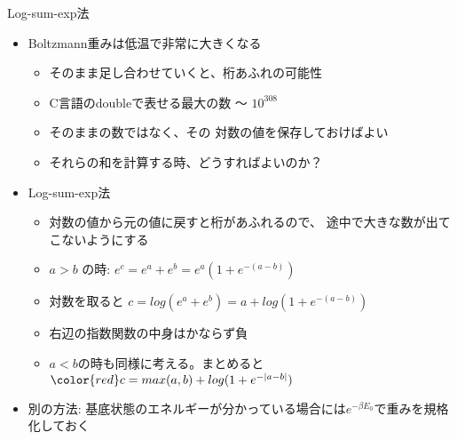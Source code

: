 
\begin{frame}[t,fragile]{Log-sum-exp法}
  \begin{itemize}
  \item Boltzmann重みは低温で非常に大きくなる
    \begin{itemize}
    \item そのまま足し合わせていくと、桁あふれの可能性
    \item C言語のdoubleで表せる最大の数 〜 $10^{308}$
    \item そのままの数ではなく、その{\color{red} 対数の値を保存}しておけばよい
    \item それらの和を計算する時、どうすればよいのか？
    \end{itemize}
  \item Log-sum-exp法
    \begin{itemize}
    \item 対数の値から元の値に戻すと桁があふれるので、{\color{red} 途中で大きな数が出てこないように}する
    \item $a > b$ の時: $e^c = e^a + e^b = e^a (1 + e^{-(a-b)})$
    \item 対数を取ると $c = log(e^a + e^b) = a + log(1 + e^{-(a-b)})$
    \item 右辺の指数関数の中身はかならず負
    \item $a < b$の時も同様に考える。まとめると \\
      $\color{red} c = max(a,b) + log(1 + e^{-|a-b|})$
    \end{itemize}
  \item 別の方法: 基底状態のエネルギーが分かっている場合には$e^{-\beta E_0}$で重みを規格化しておく
  \end{itemize}
\end{frame}
